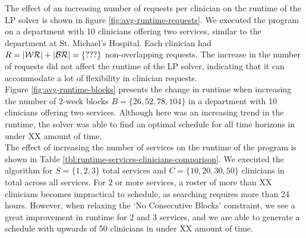 The effect of an increasing number of requests per clinician on the runtime of the LP solver is shown in figure \ref{fig:avg-runtime-requests}. We executed the program on a department with 10 clinicians offering two services, similar to the department at St. Michael's Hospital. Each clinician had $R = \abs{\mathcal{WR}} + \abs{\mathcal{BR}} = \{???\}$ non-overlapping requests. The increase in the number of requests did not affect the runtime of the LP solver, indicating that it can accommodate a lot of flexibility in clinician requests. \\


Figure \ref{fig:avg-runtime-blocks} presents the change in runtime when increasing the number of 2-week blocks $B = \{26, 52, 78, 104\}$ in a department with 10 clinicians offering two services. Although here was an increasing trend in the runtime, the solver was able to find an optimal schedule for all time horizons in under XX amount of time. \\ %


The effect of increasing the number of services %
on the runtime of the program is shown in Table \ref{tbl:runtime-services-clinicians-comparison}. We executed the algorithm for $S = \{1, 2, 3\}$ total services and $C = \{10, 20, 30, 50\}$ clinicians in total across all services. For 2 or more services, a roster of more than XX clinicians becomes impractical to schedule, as searching requires more than 24 hours. However, when relaxing the `No Consecutive Blocks' constraint, we see a great improvement in runtime for 2 and 3 services, and we are able to generate a schedule with upwards of 50 clinicians in under XX amount of time.  %

